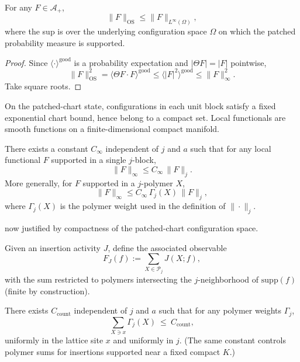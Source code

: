 \begin{lemma}\label{lem:OS_by_sup}
For any $F\in\mathcal A_+$,
\[
\|F\|_{\mathrm{OS}}\le \|F\|_{L^\infty(\Omega)},
\]
where the sup is over the underlying configuration space $\Omega$ on which the patched probability measure is supported.
\end{lemma}

\begin{proof}
Since $\langle\cdot\rangle^{\mathrm{good}}$ is a probability expectation and $|\Theta F|=|F|$ pointwise,
\[
\|F\|_{\mathrm{OS}}^2=\langle \Theta F\cdot F\rangle^{\mathrm{good}}
\le \langle |F|^2\rangle^{\mathrm{good}}
\le \|F\|_\infty^2.
\]
Take square roots.
\end{proof}

On the patched-chart state, configurations in each unit block satisfy a fixed exponential chart bound, hence belong to a compact set.
Local functionals are smooth functions on a finite-dimensional compact manifold.

\begin{proposition}\label{ass:sup_from_local}
There exists a constant $C_\infty$ independent of $j$ and $a$ such that for any local functional $F$ supported in a single $j$-block,
\[
\|F\|_{\infty}\le C_\infty\,\|F\|_j.
\]
More generally, for $F$ supported in a $j$-polymer $X$,
\[
\|F\|_\infty\le C_\infty\,\Gamma_j(X)\,\|F\|_j,
\]
where $\Gamma_j(X)$ is the polymer weight used in the definition of $\|\cdot\|_j$.
\end{proposition}

now justified by compactness of the patched-chart configuration space.

Given an insertion activity $J$, define the associated observable
\[
F_J(f):=\sum_{X\in\mathscr P_j} J(X;f),
\]
with the sum restricted to polymers intersecting the $j$-neighborhood of $\mathrm{supp}(f)$ (finite by construction).

\begin{proposition}\label{ass:counting}
There exists $C_{\mathrm{count}}$ independent of $j$ and $a$ such that for any polymer weights $\Gamma_j$,
\[
\sum_{X\ni x} \Gamma_j(X)\ \le\ C_{\mathrm{count}},
\]
uniformly in the lattice site $x$ and uniformly in $j$.
(The same constant controls polymer sums for insertions supported near a fixed compact $K$.)
\end{proposition}

